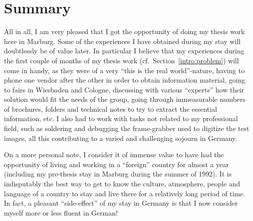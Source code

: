 
\section{Summary}
\label{concl:summary}

All in all, I am very pleased that I got the opportunity of doing my
thesis work here in Marburg.  Some of the experiences I have obtained
during my stay will doubtlessly be of value later.  In particular I
believe that my experiences during the first couple of months of my
thesis work (cf.\ Section~\ref{intro:problem}) will come in handy, as
they were of a very ``this is the real world''-nature, having to phone
one vendor after the other in order to obtain information material,
going to fairs in Wiesbaden and Cologne, discussing with various
``experts'' how their solution would fit the needs of the group, going
through immeasurable numbers of brochures, folders and technical notes
to try to extract the essential information, etc.  I also had to work
with tasks not related to my professional field, such as soldering and
debugging the frame-grabber used to digitize the test images, all this
contributing to a varied and challenging sojourn in Germany.

On a more personal note, I consider it of immense value to have had
the opportunity of living and working in a ``foreign'' country for
almost a year (including my pre-thesis stay in Marburg during the
summer of 1992).  It is indisputably the best way to get to know the
culture, atmosphere, people and language of a country to stay and live
there for a relatively long period of time.  In fact, a pleasant
``side-effect'' of my stay in Germany is that I now consider myself
more or less fluent in German!
